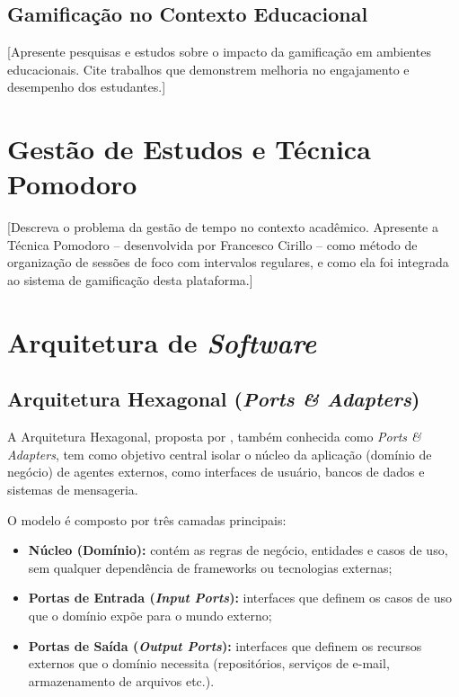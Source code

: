 \subsection{Gamificação no Contexto Educacional}
\label{subsec:gamificacao-educacional}

[Apresente pesquisas e estudos sobre o impacto da gamificação em ambientes
educacionais. Cite trabalhos que demonstrem melhoria no engajamento e desempenho
dos estudantes.]

\section{Gestão de Estudos e Técnica Pomodoro}
\label{sec:gestao-estudos}

[Descreva o problema da gestão de tempo no contexto acadêmico. Apresente a Técnica
Pomodoro -- desenvolvida por Francesco Cirillo -- como método de organização de
sessões de foco com intervalos regulares, e como ela foi integrada ao sistema de
gamificação desta plataforma.]

\section{Arquitetura de \textit{Software}}
\label{sec:arquitetura-software}

\subsection{Arquitetura Hexagonal (\textit{Ports \& Adapters})}
\label{subsec:arquitetura-hexagonal}

A Arquitetura Hexagonal, proposta por , também
conhecida como \textit{Ports \& Adapters}, tem como objetivo central isolar o núcleo
da aplicação (domínio de negócio) de agentes externos, como interfaces de usuário,
bancos de dados e sistemas de mensageria.

O modelo é composto por três camadas principais:

\begin{itemize}
  \item \textbf{Núcleo (Domínio):} contém as regras de negócio, entidades e casos
        de uso, sem qualquer dependência de frameworks ou tecnologias externas;

  \item \textbf{Portas de Entrada (\textit{Input Ports}):} interfaces que definem
        os casos de uso que o domínio expõe para o mundo externo;

  \item \textbf{Portas de Saída (\textit{Output Ports}):} interfaces que definem
        os recursos externos que o domínio necessita (repositórios, serviços de e-mail,
        armazenamento de arquivos etc.).
\end{itemize}

